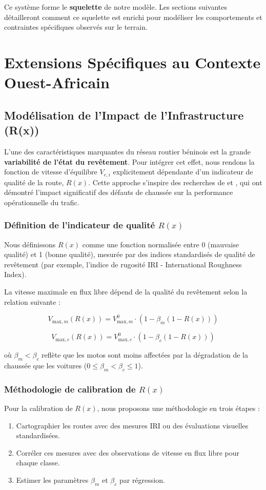 Ce système forme le \textbf{squelette} de notre modèle. Les sections suivantes détailleront comment ce squelette est enrichi pour modéliser les comportements et contraintes spécifiques observés sur le terrain.

\section{Extensions Spécifiques au Contexte Ouest-Africain}
\subsection{Modélisation de l'Impact de l'Infrastructure (R(x))}
L'une des caractéristiques marquantes du réseau routier béninois est la grande \textbf{variabilité de l'état du revêtement}. Pour intégrer cet effet, nous rendons la fonction de vitesse d'équilibre $V_{e,i}$ explicitement dépendante d'un indicateur de qualité de la route, $R(x)$. Cette approche s'inspire des recherches de \cite{Hussein2023} et \cite{Kocatepe2019}, qui ont démontré l'impact significatif des défauts de chaussée sur la performance opérationnelle du trafic.

\subsubsection{Définition de l'indicateur de qualité $R(x)$}
Nous définissons $R(x)$ comme une fonction normalisée entre 0 (mauvaise qualité) et 1 (bonne qualité), mesurée par des indices standardisés de qualité de revêtement (par exemple, l'indice de rugosité IRI - International Roughness Index).

La vitesse maximale en flux libre dépend de la qualité du revêtement selon la relation suivante :

\begin{equation}
V_{\text{max},m}(R(x)) = V_{\text{max},m}^0 \cdot \left(1 - \beta_m (1 - R(x))\right)
\end{equation}

\begin{equation}
V_{\text{max},c}(R(x)) = V_{\text{max},c}^0 \cdot \left(1 - \beta_c (1 - R(x))\right)
\end{equation}

où $\beta_m < \beta_c$ reflète que les motos sont moins affectées par la dégradation de la chaussée que les voitures ($0 \leq \beta_m < \beta_c \leq 1$).

\subsubsection{Méthodologie de calibration de $R(x)$}
Pour la calibration de $R(x)$, nous proposons une méthodologie en trois étapes :
\begin{enumerate}
    \item Cartographier les routes avec des mesures IRI ou des évaluations visuelles standardisées.
    \item Corréler ces mesures avec des observations de vitesse en flux libre pour chaque classe.
    \item Estimer les paramètres $\beta_m$ et $\beta_c$ par régression.
\end{enumerate}

